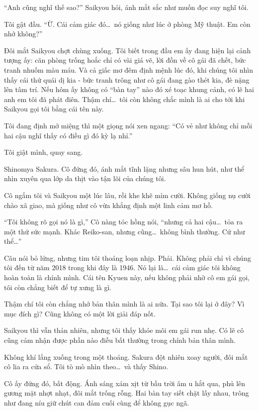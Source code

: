 \documentclass[../main.tex]{subfiles}
\begin{document}
``Anh cũng nghĩ thế sao?'' Saikyou hỏi, ánh mắt sắc như muốn đọc suy nghĩ tôi.

Tôi gật đầu. ``Ừ. Cái cảm giác đó\dots\ nó giống như lúc ở phòng Mỹ thuật. Em còn nhớ không?''

Đôi mắt Saikyou chợt chùng xuống. Tôi biết trong đầu em ấy đang hiện lại cảnh tượng ấy: căn phòng trống hoắc chỉ có vài giá vẽ, lời đồn về cô gái đã chết, bức tranh nhuốm màu máu. Và cả giấc mơ đêm định mệnh lúc đó, khi chúng tôi nhìn thấy cái thứ quái dị kia - bức tranh trông như cô gái đang gào thét kia, đè nặng lên tâm trí. Nếu hôm ấy không có ``bàn tay'' nào đó xé toạc khung cảnh, có lẽ hai anh em tôi đã phát điên. Thậm chí\dots\ tôi còn không chắc mình là ai cho tới khi Saikyou gọi tôi bằng cái tên này.

Tôi đang định mở miệng thì một giọng nói xen ngang: ``Có vẻ như không chỉ mỗi hai cậu nghĩ thấy có điều gì đó kỳ lạ nhỉ.''

Tôi giật mình, quay sang.

Shinomya Sakura. Cô đứng đó, ánh mắt tĩnh lặng nhưng sâu hun hút, như thể nhìn xuyên qua lớp da thịt vào tận lõi của chúng tôi.

Cô ngắm tôi và Saikyou một lúc lâu, rồi khe khẽ mỉm cười. Không giống nụ cười chào xã giao, mà giống như cô vừa khẳng định một linh cảm mơ hồ.

``Tôi không rõ gọi nó là gì,'' Cô nàng tóc hồng nói, ``nhưng cả hai cậu\dots\ tỏa ra một thứ sức mạnh. Khác Reiko-san, nhưng cũng\dots\ không bình thường. Cứ như thể\dots''

Câu nói bỏ lửng, nhưng tim tôi thoáng loạn nhịp. Phải. Không phải chỉ vì chúng tôi đến từ năm 2018 trong khi đây là 1946. Nó lại là\dots\ cái cảm giác tôi không hoàn toàn là chính mình. Cái tên Kyuen này, nếu không phải nhờ cô em gái gọi, tôi còn chẳng biết để tự xưng là gì.

Thậm chí tôi còn chẳng nhớ bản thân mình là ai nữa. Tại sao tôi lại ở đây? Vì mục đích gì? Cũng không có một lời giải đáp nốt.

Saikyou thì vẫn thản nhiên, nhưng tôi thấy khóe môi em gái run nhẹ. Có lẽ cô cũng cảm nhận được phần nào điều bất thường trong chính bản thân mình.

Không khí lắng xuống trong một thoáng.  Sakura đột nhiên xoay người, đôi mắt cô lia ra cửa sổ. Tôi tò mò nhìn theo\dots\ và thấy Shino.

Cô ấy đứng đó, bất động. Ánh sáng xám xịt từ bầu trời âm u hắt qua, phủ lên gương mặt nhợt nhạt, đôi mắt trống rỗng. Hai bàn tay siết chặt lấy nhau, trông như đang níu giữ chút can đảm cuối cùng để không gục ngã.
\end{document}
